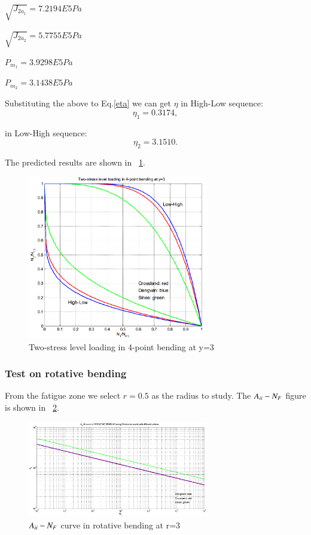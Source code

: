 \documentclass[3p,times,procedia,number]{elsarticle}
\newcommand{\figref}[1]{\figurename~\ref{#1}}
\begin{document}
\vspace{6pt}
$\sqrt{J_{2a_1}}=7.2194E5 Pa$

\vspace{6pt}
$\sqrt{J_{2a_2}}=5.7755E5 Pa$

\vspace{6pt}
$P_{m_1}=3.9298E5 Pa$

\vspace{6pt}
$P_{m_2}=3.1438E5 Pa$

Substituting the above to Eq.\eqref{eta} we can get $\eta$ in High-Low sequence:
$$\eta_1=0.3174,$$

in Low-High sequence:
$$\eta_2=3.1510.$$

The predicted results are shown in \figref{2stressB}.

\begin{figure}[h!]
	\centering
	\includegraphics[width=0.7\textwidth]{figures//2stressB.png} 
	\caption{Two-stress level loading in 4-point bending at y=3}
	\label{2stressB}
\end{figure}

\newpage
\subsubsection{Test on rotative bending}
From the fatigue zone we select $r=0.5$ as the radius to study. 
The $A_{\uppercase\expandafter{\romannumeral2}}-N_F$ figure is shown in \figref{JNRB}.

\begin{figure}[h!]
	\centering
	\includegraphics[width=0.7\textwidth]{figures//JNRB.png} 
	\caption{$A_{\uppercase\expandafter{\romannumeral2}}-N_F$ curve in rotative bending at r=3}
	\label{JNRB}
\end{figure}
\end{document}
